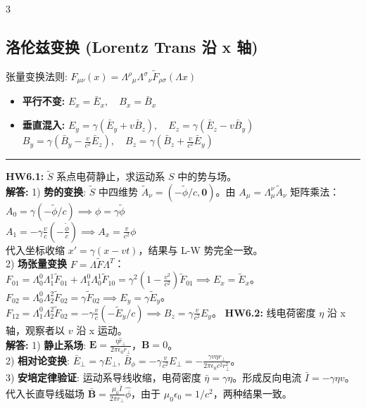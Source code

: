 \documentclass[9pt,a4paper]{article} %
\newcommand{\mbf}[1]{\mathbf{#1}}
\begin{document}
\begin{multicols*}{3}
\subsection*{洛伦兹变换 (Lorentz Trans 沿 x 轴)}
张量变换法则: $F_{\mu\nu}(x) = {\Lambda^\rho}_\mu {\Lambda^\sigma}_\nu \tilde{F}_{\rho\sigma}(\Lambda x)$
\begin{itemize}
    \item \textbf{平行不变:} $E_x = \bar{E}_x, \quad B_x = \bar{B}_x$
    \item \textbf{垂直混入:} 
    $E_y = \gamma(\bar{E}_y + v\bar{B}_z), \quad E_z = \gamma(\bar{E}_z - v\bar{B}_y)$ \\
    $B_y = \gamma(\bar{B}_y - \frac{v}{c^2}\bar{E}_z), \quad B_z = \gamma(\bar{B}_z + \frac{v}{c^2}\bar{E}_y)$
\end{itemize}

\vspace{1ex}\hrule\vspace{1ex}

\noindent\textbf{HW6.1:} $\tilde{S}$ 系点电荷静止，求运动系 $S$ 中的势与场。\\
\textbf{解答:} 1) \textbf{势的变换}: $\tilde{S}$ 中四维势 $\tilde{A}_\nu = (-\tilde{\phi}/c, \mbf{0})$。由 $A_\mu = \Lambda^\nu_\mu \tilde{A}_\nu$ 矩阵乘法：\\
$A_0 = \gamma(-\tilde{\phi}/c) \implies \phi = \gamma\tilde{\phi}$ \\
$A_1 = -\gamma \frac{v}{c}(-\frac{\tilde{\phi}}{c}) \implies A_x = \frac{v}{c^2}\phi$ \\
代入坐标收缩 $x' = \gamma(x-vt)$，结果与 L-W 势完全一致。\\
2) \textbf{场张量变换} $F = \Lambda \tilde{F} \Lambda^T$：\\
$F_{01} = \Lambda^0_0 \Lambda^1_1 \tilde{F}_{01} + \Lambda^0_1 \Lambda^1_0 \tilde{F}_{10} = \gamma^2(1 - \frac{v^2}{c^2})\tilde{F}_{01} \implies E_x = \tilde{E}_x$。\\
$F_{02} = \Lambda^0_0 \Lambda^2_2 \tilde{F}_{02} = \gamma \tilde{F}_{02} \implies E_y = \gamma\tilde{E}_y$。\\
$F_{12} = \Lambda^0_1 \Lambda^2_2 \tilde{F}_{02} = -\gamma\frac{v}{c}(-\tilde{E}_y/c) \implies B_z = \gamma\frac{v}{c^2}E_y$。
\vspace{0.5ex}
\noindent\textbf{HW6.2:} 线电荷密度 $\eta$ 沿 x 轴，观察者以 $v$ 沿 x 运动。\\
\textbf{解答:} 1) \textbf{静止系场}: $\mbf{E} = \frac{\eta\hat{r}_\perp}{2\pi\epsilon_0 r_\perp}$，$\mbf{B}=0$。\\
2) \textbf{相对论变换}: $\bar{E}_\perp = \gamma E_\perp$, $\bar{B}_\phi = -\gamma\frac{v}{c^2}E_\perp = -\frac{\gamma v \eta r_\perp}{2\pi\epsilon_0 c^2 r_\perp^2}$。\\
3) \textbf{安培定律验证}: 运动系导线收缩，电荷密度 $\bar{\eta}=\gamma\eta$。形成反向电流 $\bar{I} = -\gamma\eta v$。代入长直导线磁场 $\bar{\mbf{B}} = \frac{\mu_0 \bar{I}}{2\pi r_\perp}\hat{\phi}$，由于 $\mu_0\epsilon_0 = 1/c^2$，两种结果一致。



\end{multicols*}
\end{document}
